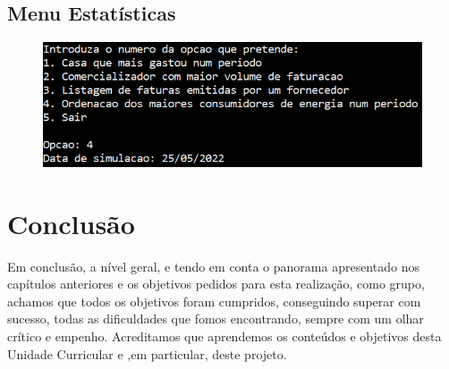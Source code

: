 \documentclass[11pt,a4paper]{report}
\begin{document}
	\section{Menu Estatísticas}
	\begin{figure}[H]
        \includegraphics[scale=0.6]{menu3.png}
	\end{figure}
	

\pagebreak
	\chapter{Conclusão}
    
    Em conclusão, a nível geral, e tendo em conta o panorama apresentado nos capítulos anteriores e os objetivos pedidos para esta realização, como grupo, achamos que todos os objetivos foram cumpridos, conseguindo superar com sucesso, todas as dificuldades que fomos encontrando,  sempre com um olhar crítico e empenho. Acreditamos que aprendemos os conteúdos e objetivos desta Unidade Curricular e ,em particular, deste projeto.
	
\end{document}
